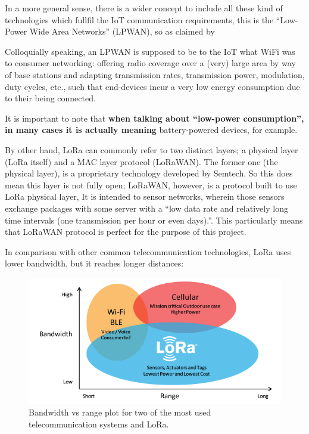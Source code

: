 \documentclass[11pt,a4paper,dvipsnames,twoside]{article}
\newcommand{\lang}[1] {\textbf{\color{Tomato1}#1}}
\begin{document}
In a more general sense, there is a wider concept to include all these kind of technologies which fullfil the IoT communication requirements, this is the \enquote{Low-Power Wide Area Networks} (LPWAN), so as claimed by \cite[]{LoRaGeneral}

\begin{quoting}
  Colloquially  speaking,  an LPWAN is supposed to be to the IoT what WiFi was to consumer networking: offering radio coverage over a (very) large area by way of base stations and adapting transmission rates, transmission power, modulation, duty cycles, etc., such that end-devices incur a very low energy consumption due to their being connected.
\end{quoting}

It is important to note that \lang{when talking about \enquote{low-power consumption}, in many cases it is actually meaning} battery-powered devices, for example.

By other hand, LoRa can commonly refer to two distinct layers; a physical layer (LoRa itself) and a MAC layer protocol (LoRaWAN). The former one (the physical layer), is a proprietary technology developed by Semtech. So this does mean this layer is not fully open; LoRaWAN, however, is a protocol built to use LoRa physical layer,  It is intended to sensor networks, wherein those sensors exchange packages with some server with a \enquote{low data rate and relatively long time intervals (one transmission per hour or even days).}\cite[p.~9]{LoRaGeneral}. This particularly means that LoRaWAN protocol is perfect for the purpose of this project.  

In comparison with other common telecommunication technologies, LoRa uses lower bandwidth, but it reaches longer distances:

\begin{figure}[htp]
  \centering
  \includegraphics[width=.9\textwidth]{../../pictures/LoRa_Why_Range.png}
  \caption{Bandwidth vs range plot for two of the most used telecommunication systems and LoRa.}
  \label{fig:LoraComparison}
\end{figure}
 
\end{document}
